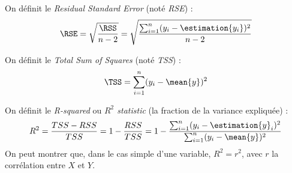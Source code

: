         \begin{definition}
            On définit le \textit{Residual Standard Error} (noté \textit{RSE}) :
            \[
                \RSE = \sqrt{\frac{\RSS}{n-2}} = \sqrt{\frac{\sum_{i=1}^n (y_i - \estimation{y_i})^2}{n - 2}}
            \]

            On définit le \textit{Total Sum of Squares} (noté \textit{TSS}) :
            \[
                \TSS = \sum_{i=1}^n (y_i - \mean{y})^2
            \]

            On définit le \textit{R-squared} ou \textit{\(R^2\) statistic} (la fraction de la variance expliquée) :
            \[
                R^2 = \frac{TSS - RSS}{TSS} = 1 - \frac{RSS}{TSS} = 1 - \frac{\sum_{i=1}^n (y_i - \estimation{y}_i)^2}{\sum_{i=1}^n (y_i - \mean{y})^2}
            \]
            On peut montrer que, dans le cas simple d'une variable, \(R^2 = r^2\), avec \(r\) la corrélation entre \(X\) et \(Y\).
        \end{definition}

